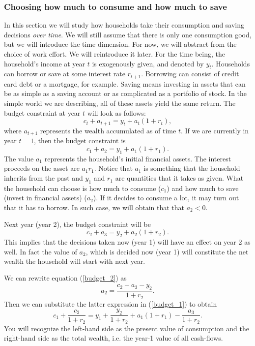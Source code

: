 \documentclass[letterpaper,12pt]{article}
\begin{document}
\subsubsection*{Choosing how much to consume and how much to save}%

In this section we will study how households take their
consumption and saving decisions \textit{over time}. We will still
assume that there is only one consumption good, but we will
introduce the time dimension. For now, we will abstract from the
choice of work effort. We will reintroduce it later. For the time
being, the household's income at year $t$ is exogenously given,
and denoted by $y_{t}$. Households can borrow or save at some
interest rate $r_{t+1}$. Borrowing can consist of credit card debt
or a mortgage, for example. Saving means investing in assets that
can be as simple as a saving account or as complicated as a
portfolio of stock. In the simple world we are describing, all of
these assets yield the same return. The budget constraint at year
$t$ will look as follows:
%
\begin{equation*}
c_{t}+a_{t+1}=y_{t}+a_{t}(1+r_{t}),
\end{equation*}
%
where $a_{t+1}$ represents the wealth accumulated as of time $t$.
If we are currently in year $t=1$, then the budget constraint is
%
\begin{equation}
c_{1}+a_{2}=y_{1}+a_{1}(1+r_{1}).\label{budget_1}
\end{equation}
%
The value $a_{1}$ represents the household's initial financial
assets. The interest proceeds on the asset are $a_{1}r_{1}$.
Notice that $a_{1}$ is something that the household inherits from
the past and $y_{1}$ and $r_{1}$ are quantities that it takes as
given. What the household can choose is how much to consume
($c_{1}$) and how much to save (invest in financial assets)
($a_{2}$). If it decides to consume a lot, it may turn out that it
has to borrow. In such case, we will obtain that that $a_{2}<0$.

Next year (year 2), the budget constraint will be
%
\begin{equation}
c_{2}+a_{3}=y_{2}+a_{2}(1+r_{2}).\label{budget_2}
\end{equation}
%
This implies that the decisions taken now (year 1) will have an effect on year 2 as well. In fact
the value of $a_{2}$, which is decided now (year 1) will constitute the net wealth the household
will start with next year.

We can rewrite equation (\ref{budget_2}) as
%
\begin{equation*}
a_{2}=\frac{c_{2}+a_{3}-y_{2}}{1+r_{2}}.
\end{equation*}
%
Then we can substitute the latter expression in (\ref{budget_1})
to obtain
%
\begin{equation*}
c_{1}+\frac{c_{2}}{1+r_{2}}=y_{1}+\frac{y_{2}}{1+r_{2}}+a_{1}(1+r_{1})-\frac{a_{3}}{1+r_{2}}.
\end{equation*}
%
You will recognize the left-hand side as the present value of consumption and the right-hand side
as the total wealth, i.e. the year-1 value of all cash-flows.
\end{document}

